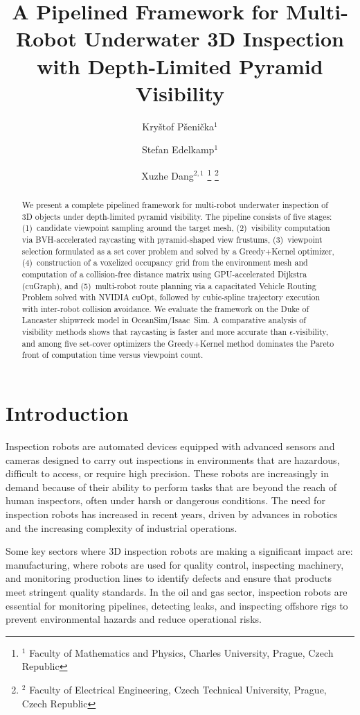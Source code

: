 \documentclass[letterpaper, 10 pt, conference]{ieeeconf}  %
\title{\LARGE \bf
A Pipelined Framework for Multi-Robot Underwater 3D Inspection with Depth-Limited Pyramid Visibility
}
\author{Kryštof Pšenička$^{1}$  \and Stefan Edelkamp$^{1}$ \and Xuzhe Dang$^{2,1}$%
\thanks{$^{1}$%
Faculty of Mathematics and Physics, 
Charles University, Prague, Czech Republic 
}
\thanks{$^{2}$ 
Faculty of Electrical Engineering,
Czech Technical University, Prague, Czech Republic 
}%
}
\begin{document}
\maketitle
\thispagestyle{empty}
\pagestyle{empty}


\begin{abstract}
We present a complete pipelined framework for multi-robot underwater inspection of 3D objects under depth-limited pyramid visibility. The pipeline consists of five stages: (1)~candidate viewpoint sampling around the target mesh, (2)~visibility computation via BVH-accelerated raycasting with pyramid-shaped view frustums, (3)~viewpoint selection formulated as a set cover problem and solved by a Greedy+Kernel optimizer, (4)~construction of a voxelized occupancy grid from the environment mesh and computation of a collision-free distance matrix using GPU-accelerated Dijkstra (cuGraph), and (5)~multi-robot route planning via a capacitated Vehicle Routing Problem solved with NVIDIA cuOpt, followed by cubic-spline trajectory execution with inter-robot collision avoidance. We evaluate the framework on the Duke of Lancaster shipwreck model in OceanSim/Isaac~Sim. A comparative analysis of visibility methods shows that raycasting is faster and more accurate than $\epsilon$-visibility, and among five set-cover optimizers the Greedy+Kernel method dominates the Pareto front of computation time versus viewpoint count.
\end{abstract}



\section{Introduction}

Inspection robots are automated devices equipped with advanced sensors and cameras designed to carry out inspections in environments that are hazardous, difficult to access, or require high precision. These robots are increasingly in demand because of their ability to perform tasks that are beyond the reach of human inspectors, often under harsh or dangerous conditions. The need for inspection robots has increased in recent years, driven by advances in robotics and the increasing complexity of industrial operations.

Some key sectors where 3D inspection robots are making a significant impact are: manufacturing, where robots are used for quality control, inspecting machinery, and monitoring production lines to identify defects and ensure that products meet stringent quality standards.
In the oil and gas sector, inspection robots are essential for monitoring pipelines, detecting leaks, and inspecting offshore rigs to prevent environmental hazards and reduce operational risks.
\end{document}
